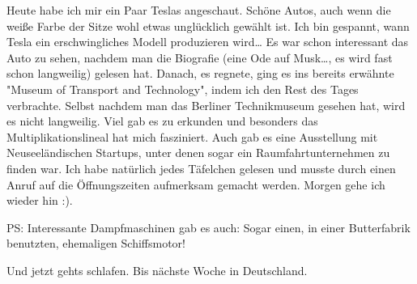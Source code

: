Heute habe ich mir ein Paar Teslas angeschaut. Schöne Autos, auch wenn
die weiße Farbe der Sitze wohl etwas unglücklich gewählt ist. Ich bin
gespannt, wann Tesla ein erschwingliches Modell produzieren wird\ldots{}
Es war schon interessant das Auto zu sehen, nachdem man die Biografie
(eine Ode auf Musk\ldots, es wird fast schon langweilig) gelesen hat.
Danach, es regnete, ging es ins bereits erwähnte "Museum of Transport
and Technology", indem ich den Rest des Tages verbrachte. Selbst nachdem
man das Berliner Technikmuseum gesehen hat, wird es nicht langweilig.
Viel gab es zu erkunden und besonders das Multiplikationslineal hat mich
fasziniert. Auch gab es eine Ausstellung mit Neuseeländischen Startups,
unter denen sogar ein Raumfahrtunternehmen zu finden war. Ich habe
natürlich jedes Täfelchen gelesen und musste durch einen Anruf auf die
Öffnungszeiten aufmerksam gemacht werden. Morgen gehe ich wieder hin :).

PS: Interessante Dampfmaschinen gab es auch: Sogar einen, in einer
Butterfabrik benutzten, ehemaligen Schiffsmotor!

Und jetzt gehts schlafen. Bis nächste Woche in Deutschland.
